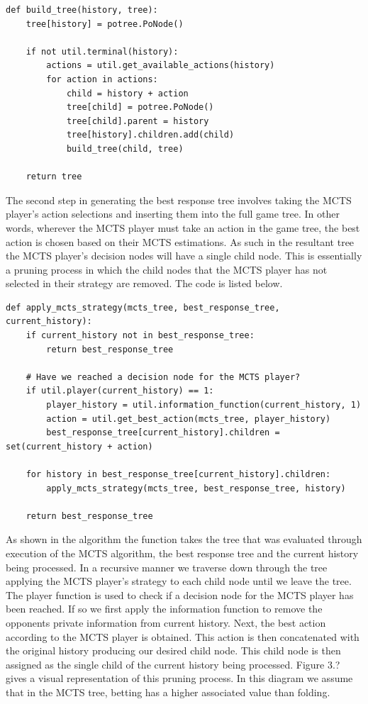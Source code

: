 \begin{lstlisting}[style=Python]
def build_tree(history, tree):
    tree[history] = potree.PoNode()

    if not util.terminal(history):
        actions = util.get_available_actions(history)
        for action in actions:
            child = history + action
            tree[child] = potree.PoNode()
            tree[child].parent = history
            tree[history].children.add(child)
            build_tree(child, tree)

    return tree
\end{lstlisting}

The second step in generating the best response tree involves taking the MCTS player's action
selections and inserting them into the full game tree\citep{heinrich2017reinforcement}.
In other words, wherever the MCTS player must take an action in the game tree, the best action is chosen
based on their MCTS estimations.
As such in the resultant tree the MCTS player's decision nodes will have
a single child node.
This is essentially a pruning process in which the child nodes that the MCTS player has
not selected in their strategy are removed.
The code is listed below.

\begin{lstlisting}[style=Python]
def apply_mcts_strategy(mcts_tree, best_response_tree, current_history):
    if current_history not in best_response_tree:
        return best_response_tree

    # Have we reached a decision node for the MCTS player?
    if util.player(current_history) == 1:
        player_history = util.information_function(current_history, 1)
        action = util.get_best_action(mcts_tree, player_history)
        best_response_tree[current_history].children = set(current_history + action)

    for history in best_response_tree[current_history].children:
        apply_mcts_strategy(mcts_tree, best_response_tree, history)

    return best_response_tree
\end{lstlisting}

As shown in the algorithm the function takes the tree that was evaluated
through execution of the MCTS algorithm, the best response tree and the current history being processed.
In a recursive manner we traverse down through the tree applying the MCTS player's
strategy to each child node until we leave the tree.
The player function is used to check if a decision node for the MCTS player has been reached.
If so we first apply the information function to remove the opponents private information from current history.
Next, the best action according to the MCTS player is obtained.
This action is then concatenated with the original history producing our desired child node.
This child node is then assigned as the single child of the current history being processed.
Figure 3.? gives a visual representation of this pruning process.
In this diagram we assume that in the MCTS tree, betting has a higher associated value than folding.

